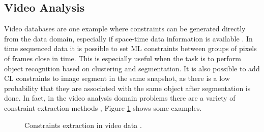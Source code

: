 \subsection{Video Analysis}

Video databases are one example where constraints can be generated directly from the data domain, especially if space-time data information is available \cite{yan2006discriminative}. In time sequenced data it is possible to set \acs{ML} constraints between groups of pixels of frames close in time. This is especially useful when the task is to perform object recognition based on clustering and segmentation. It is also possible to add \acs{CL} constraints to image segment in the same snapshot, as there is a low probability that they are associated with the same object after segmentation is done. In fact, in the video analysis domain problems there are a variety of constraint extraction methods \cite{yan2006discriminative}, Figure \ref{fig:ConstExtractionVideo} shows some examples. 

\begin{figure}[bth]
	\myfloatalign
	\quad
	 \quad
	\quad
	\caption[Constraints extraction in video data.]{Constraints extraction in video data \cite{yan2006discriminative,davidson2007survey}.}\label{fig:ConstExtractionVideo}
\end{figure}

